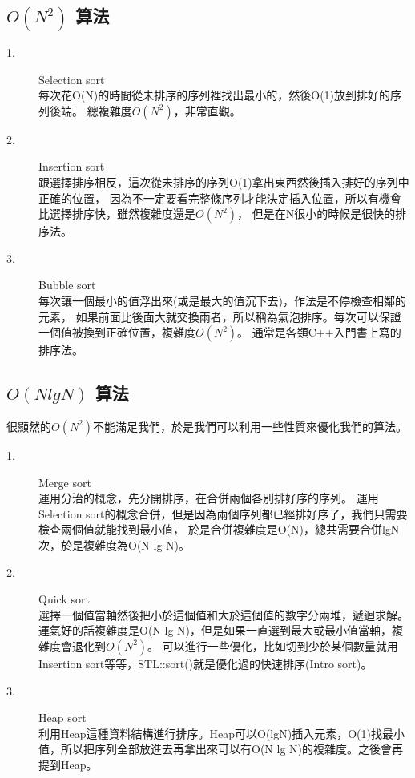 \documentclass{article}
\begin{document}
\subsection{ $O(N^2)$ 算法}
\begin{description}
\item[ 1.]Selection sort\\
每次花O(N)的時間從未排序的序列裡找出最小的，然後O(1)放到排好的序列後端。
總複雜度$O(N^2)$，非常直觀。
\item[ 2.]Insertion sort\\
跟選擇排序相反，這次從未排序的序列O(1)拿出東西然後插入排好的序列中正確的位置，
因為不一定要看完整條序列才能決定插入位置，所以有機會比選擇排序快，雖然複雜度還是$O(N^2)$，
但是在N很小的時候是很快的排序法。
\item[ 3.]Bubble sort\\
每次讓一個最小的值浮出來(或是最大的值沉下去)，作法是不停檢查相鄰的元素，
如果前面比後面大就交換兩者，所以稱為氣泡排序。每次可以保證一個值被換到正確位置，複雜度$O(N^2)$。
通常是各類C++入門書上寫的排序法。
\end{description} 

\subsection{ $O(N lg N)$ 算法}
很顯然的$O(N^2)$不能滿足我們，於是我們可以利用一些性質來優化我們的算法。
\begin{description}
\item[ 1.]Merge sort\\
運用分治的概念，先分開排序，在合併兩個各別排好序的序列。
運用Selection sort的概念合併，但是因為兩個序列都已經排好序了，我們只需要檢查兩個值就能找到最小值，
於是合併複雜度是O(N)，總共需要合併lgN次，於是複雜度為O(N lg N)。
\item[ 2.]Quick sort\\
選擇一個值當軸然後把小於這個值和大於這個值的數字分兩堆，遞迴求解。
運氣好的話複雜度是O(N lg N)，但是如果一直選到最大或最小值當軸，複雜度會退化到$O(N^2)$。
可以進行一些優化，比如切到少於某個數量就用Insertion sort等等，STL::sort()就是優化過的快速排序(Intro sort)。
\item[ 3.]Heap sort\\
利用Heap這種資料結構進行排序。Heap可以O(lgN)插入元素，O(1)找最小值，所以把序列全部放進去再拿出來可以有O(N lg N)的複雜度。之後會再提到Heap。
\end{description} 
\end{document}
